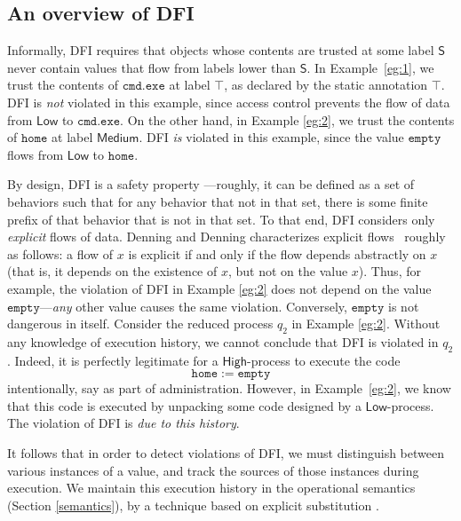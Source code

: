 \documentclass{sigplanconf}
\newcommand{\labb}{\mathsf S}
\begin{document}
\subsection{An overview of DFI}\label{introDFI}
Informally, DFI requires that objects whose contents are trusted at some label $\labb$ never contain values that flow from labels lower than $\labb$. In Example~\ref{eg:1}, we trust the contents of $\mathtt{cmd.exe}$ at label $\top$, as declared by the static annotation $\top$. DFI is \emph{not} violated in this example, since access control prevents the flow of data from $\mathsf{Low}$ to $\mathtt{cmd.exe}$. On the other hand, in Example \ref{eg:2}, we trust the contents of $\mathtt{home}$ at label $\mathsf{Medium}$. DFI \emph{is} violated in this example, since the value $\mathtt{empty}$ flows from $\mathsf{Low}$ to $\mathtt{home}$. 

By design, DFI is a safety property  \cite{alpernschneider}---roughly, it can be defined as a set of behaviors such that for any behavior that not in that set, there is some finite prefix of that behavior that is not in that set. To that end, DFI considers only \emph{explicit} flows of data. Denning and Denning characterizes explicit flows~\cite{denningcert} roughly as follows: a flow of $x$ is explicit if and only if the flow depends abstractly on $x$ (that is, it depends on the existence of $x$, but not on the value $x$). Thus, for example, the violation of DFI in Example \ref{eg:2} does not depend on the value $\mathtt{empty}$---\emph{any} other value causes the same violation. Conversely, $\mathtt{empty}$ is not dangerous in itself. Consider the reduced process $q_2$
in Example \ref{eg:2}. Without any knowledge of execution history, we cannot conclude that DFI is violated in $q_2$. Indeed, it is perfectly legitimate for a $\mathsf{High}$-process to execute the code $$\mathtt{home} := \mathtt{empty}$$ 
intentionally, say as part of administration. However, in Example~\ref{eg:2}, we know that this code is executed by unpacking some code designed by a $\mathsf{Low}$-process. The violation of DFI is \emph{due to this history}. 

It follows that in order to detect violations of DFI, we must distinguish between various instances of a value, and track the sources of those instances during execution. 
We maintain this execution history in
the operational semantics (Section \ref{semantics}), by a technique based on explicit substitution \cite{abadi90explicit}. 
\end{document}
